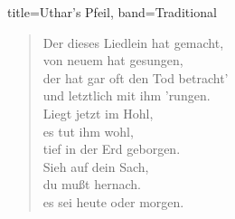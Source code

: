 \begin{song}{title=Uthar's Pfeil, band=Traditional}
    \begin{verse}
        Der dieses Liedlein hat gemacht, \\
        von neuem hat gesungen, \\
        der hat gar oft den Tod betracht' \\
        und letztlich mit ihm 'rungen. \\
        Liegt jetzt im Hohl, \\
        es tut ihm wohl, \\
        tief in der Erd geborgen. \\
        Sieh auf dein Sach, \\
        du mußt hernach. \\
        es sei heute oder morgen. \\
    \end{verse}

\end{song}
